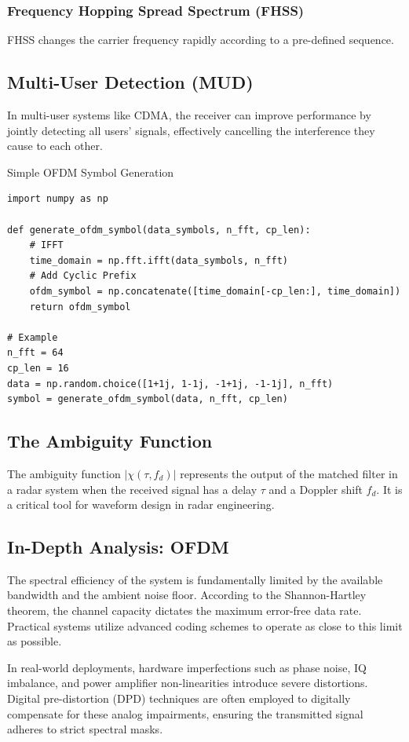 \subsubsection{Frequency Hopping Spread Spectrum (FHSS)}
FHSS changes the carrier frequency rapidly according to a pre-defined sequence.

\subsection{Multi-User Detection (MUD)}
In multi-user systems like CDMA, the receiver can improve performance by jointly detecting all users' signals, effectively cancelling the interference they cause to each other.

\begin{pythonbox}{Simple OFDM Symbol Generation}
\begin{verbatim}
import numpy as np

def generate_ofdm_symbol(data_symbols, n_fft, cp_len):
    # IFFT
    time_domain = np.fft.ifft(data_symbols, n_fft)
    # Add Cyclic Prefix
    ofdm_symbol = np.concatenate([time_domain[-cp_len:], time_domain])
    return ofdm_symbol

# Example
n_fft = 64
cp_len = 16
data = np.random.choice([1+1j, 1-1j, -1+1j, -1-1j], n_fft)
symbol = generate_ofdm_symbol(data, n_fft, cp_len)
\end{verbatim}
\end{pythonbox}

\subsection{The Ambiguity Function}
The ambiguity function $|\chi(\tau, f_d)|$ represents the output of the matched filter in a radar system when the received signal has a delay $\tau$ and a Doppler shift $f_d$. It is a critical tool for waveform design in radar engineering.

\subsection{In-Depth Analysis: OFDM}
The spectral efficiency of the system is fundamentally limited by the available bandwidth and the ambient noise floor. According to the Shannon-Hartley theorem, the channel capacity dictates the maximum error-free data rate. Practical systems utilize advanced coding schemes to operate as close to this limit as possible.

In real-world deployments, hardware imperfections such as phase noise, IQ imbalance, and power amplifier non-linearities introduce severe distortions. Digital pre-distortion (DPD) techniques are often employed to digitally compensate for these analog impairments, ensuring the transmitted signal adheres to strict spectral masks.

